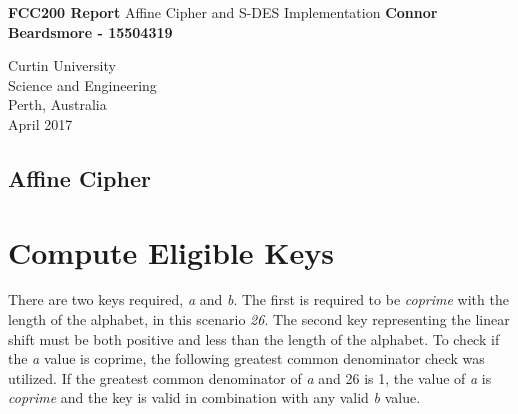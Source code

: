 \documentclass[]{article}
\begin{document}

\begin{titlepage}
	\begin{center}
		\vspace*{1cm}
		\LARGE\textbf{FCC200 Report}
		\break
		Affine Cipher and S-DES Implementation
		\vspace{1cm}
		\break
		\Large\textbf{Connor Beardsmore - 15504319} 
		\vspace{15cm}

		\normalsize
		Curtin University \\
		Science and Engineering \\
		Perth, Australia \\
	    April 2017
	    
	\end{center}
\end{titlepage}


\vspace*{-0.8cm}
\begin{center}
	\section*{Affine Cipher}
\end{center}

\vspace*{0.8cm}
\section*{Compute Eligible Keys}

There are two keys required, \textit{a} and \textit{b}. The first is required to be \textit{coprime} with the length of the alphabet, in this scenario \textit{26}. The second key representing the linear shift must be both positive and less than the length of the alphabet. To check if the \textit{a} value is coprime, the following greatest common denominator check was utilized. If the greatest common denominator of \textit{a} and 26 is 1, the value of \textit{a} is \textit{coprime} and the key is valid in combination with any valid \textit{b} value.\\
\end{document}
